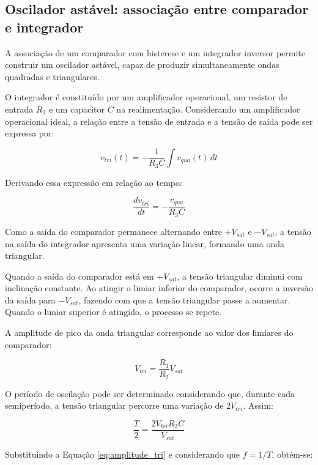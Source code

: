 \documentclass[11pt,a4paper]{article}
\begin{document}
\subsection{Oscilador astável: associação entre comparador e integrador}

A associação de um comparador com histerese e um integrador inversor permite construir um oscilador astável, capaz de produzir simultaneamente ondas quadradas e triangulares.

O integrador é constituído por um amplificador operacional, um resistor de entrada $R_3$ e um capacitor $C$ na realimentação. Considerando um amplificador operacional ideal, a relação entre a tensão de entrada e a tensão de saída pode ser expressa por:

\begin{equation}
v_{tri}(t)=-\frac{1}{R_3C}
\int v_{qua}(t)\,dt
\end{equation}

Derivando essa expressão em relação ao tempo:

\begin{equation}
\frac{dv_{tri}}{dt}
=-\frac{v_{qua}}{R_3C}
\end{equation}

Como a saída do comparador permanece alternando entre $+V_{sat}$ e $-V_{sat}$, a tensão na saída do integrador apresenta uma variação linear, formando uma onda triangular.

Quando a saída do comparador está em $+V_{sat}$, a tensão triangular diminui com inclinação constante. Ao atingir o limiar inferior do comparador, ocorre a inversão da saída para $-V_{sat}$, fazendo com que a tensão triangular passe a aumentar. Quando o limiar superior é atingido, o processo se repete.

A amplitude de pico da onda triangular corresponde ao valor dos limiares do comparador:

\begin{equation}
V_{tri}=\frac{R_1}{R_2}V_{sat}
\label{eq:amplitude_tri}
\end{equation}

O período de oscilação pode ser determinado considerando que, durante cada semiperíodo, a tensão triangular percorre uma variação de $2V_{tri}$. Assim:

\begin{equation}
\frac{T}{2}=
\frac{2V_{tri}R_3C}{V_{sat}}
\end{equation}

Substituindo a Equação \ref{eq:amplitude_tri} e considerando que $f=1/T$, obtém-se:
\end{document}
